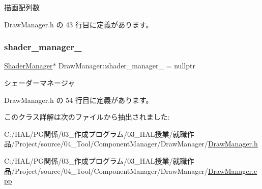 描画配列数 



 Draw\+Manager.\+h の 43 行目に定義があります。

\mbox{\label{class_draw_manager_aac4cfc76f2953c30ed5eac54b544d0ad}} 
\subsubsection{\texorpdfstring{shader\+\_\+manager\+\_\+}{shader\_manager\_}}
{\footnotesize\ttfamily \mbox{\hyperlink{class_shader_manager}{Shader\+Manager}}$\ast$ Draw\+Manager\+::shader\+\_\+manager\+\_\+ = nullptr\hspace{0.3cm}{\ttfamily [private]}}



シェーダーマネージャ 



 Draw\+Manager.\+h の 54 行目に定義があります。



このクラス詳解は次のファイルから抽出されました\+:\begin{DoxyCompactItemize}
\item 
C\+:/\+H\+A\+L/\+P\+G関係/03\+\_\+作成プログラム/03\+\_\+\+H\+A\+L授業/就職作品/\+Project/source/04\+\_\+\+Tool/\+Component\+Manager/\+Draw\+Manager/\mbox{\hyperlink{_draw_manager_8h}{Draw\+Manager.\+h}}\item 
C\+:/\+H\+A\+L/\+P\+G関係/03\+\_\+作成プログラム/03\+\_\+\+H\+A\+L授業/就職作品/\+Project/source/04\+\_\+\+Tool/\+Component\+Manager/\+Draw\+Manager/\mbox{\hyperlink{_draw_manager_8cpp}{Draw\+Manager.\+cpp}}\end{DoxyCompactItemize}
